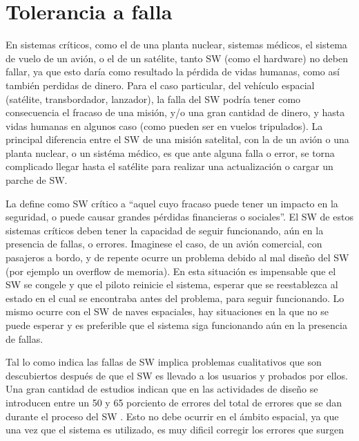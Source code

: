 \section{Tolerancia a falla}\label{chap:FaultTolerance}
En sistemas críticos, como el de una planta nuclear, sistemas médicos, el sistema de vuelo 
de un avión, o el de un satélite, tanto \ac{SW} (como el hardware) no deben fallar, ya que esto daría 
como resultado la pérdida de vidas humanas, como así también perdidas de dinero.
Para el caso particular, del vehículo espacial 
(satélite, transbordador, lanzador), la falla del \ac{SW} podría tener como consecuencia el
fracaso de una misión, y/o una gran cantidad de dinero, y hasta vidas humanas en algunos caso (como pueden ser en vuelos 
tripulados). La principal diferencia entre el \ac{SW} de una misión satelital, con la de un avión 
o una planta nuclear, o un sistéma médico, es que ante alguna falla o error, se torna complicado 
llegar hasta el satélite para realizar una actualización o cargar un parche de \ac{SW}.

La \cite{IEEE610.12} define como \ac{SW} crítico a ``aquel cuyo fracaso puede tener un impacto en 
la seguridad, o puede causar grandes pérdidas financieras o sociales''. El \ac{SW} de estos 
sistemas críticos deben tener la capacidad de seguir funcionando, aún en la presencia de fallas, o 
errores. Imaginese el caso, de un avión comercial, con pasajeros a bordo, y de repente ocurre un 
problema debido al mal diseño del \ac{SW} (por ejemplo un overflow de memoria). En esta situación 
es impensable que el \ac{SW} se congele y que el piloto reinicie el sistema, esperar que se 
reestablezca al estado en el cual se encontraba antes del problema, para seguir funcionando. Lo 
mismo ocurre con el \ac{SW} de naves espaciales, hay situaciones en la que no se puede esperar y es 
preferible que el sistema siga funcionando aún en la presencia de fallas.

Tal lo como indica \cite{pressman01} las fallas de \ac{SW} implica problemas cualitativos que son 
descubiertos después de que el \ac{SW} es llevado a los usuarios y probados por ellos. Una 
gran cantidad de estudios indican que en las actividades de diseño se introducen entre un 50 y 65 
porciento de errores del total de errores que se dan durante el proceso del \ac{SW} 
\citep{pressman01}. Esto no debe ocurrir en el ámbito espacial, ya que una vez que el sistema es 
utilizado, es muy dificil corregir los errores que surgen 

